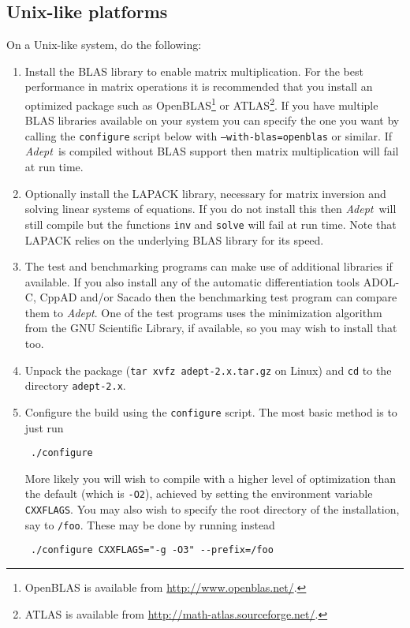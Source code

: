 \documentclass[a4,oneside]{book}
\def\codesize{\small}
\def\Adept{\emph{Adept}}
\def\code#1{{\codesize\texttt{#1}}}
\begin{document}
\subsection{Unix-like platforms}
\label{sec:unix}
On a Unix-like system, do the following:
\begin{enumerate}
\item Install the BLAS library to enable matrix multiplication.  For
  the best performance in matrix operations it is recommended that you
  install an optimized package such as OpenBLAS\footnote{OpenBLAS is
    available from \url{http://www.openblas.net/}.} or
  ATLAS\footnote{ATLAS is available from
    \url{http://math-atlas.sourceforge.net/}.}.  If you have multiple
  BLAS libraries available on your system you can specify the one you
  want by calling the \code{configure} script below with
  \code{--with-blas=openblas} or similar.  If \Adept\ is compiled
  without BLAS support then matrix multiplication will fail at run
  time.
\item Optionally install the LAPACK library, necessary for matrix
  inversion and solving linear systems of equations. If you do not
  install this then \Adept\ will still compile but the functions
  \code{inv} and \code{solve} will fail at run time. Note that LAPACK
  relies on the underlying BLAS library for its speed.
\item The test and benchmarking programs can make use of additional
  libraries if available. If you also install any of the automatic
  differentiation tools ADOL-C, CppAD and/or Sacado then the
  benchmarking test program can compare them to \Adept. One of the
  test programs uses the minimization algorithm from the GNU
  Scientific Library, if available, so you may wish to install that
  too.
\item Unpack the package (\code{tar xvfz adept-2.x.tar.gz} on Linux)
  and \code{cd} to the directory \code{adept-2.x}.
\item Configure the build using the \code{configure} script. The most
  basic method is to just run
\begin{lstlisting}
 ./configure
\end{lstlisting}
More likely you will wish to compile with a higher level of
optimization than the default (which is \code{-O2}), achieved by
setting the environment variable \code{CXXFLAGS}. You may also wish to
specify the root directory of the installation, say to
\code{/foo}. These may be done by running instead
\begin{lstlisting}
 ./configure CXXFLAGS="-g -O3" --prefix=/foo

\end{lstlisting}
\end{enumerate}
\end{document}
